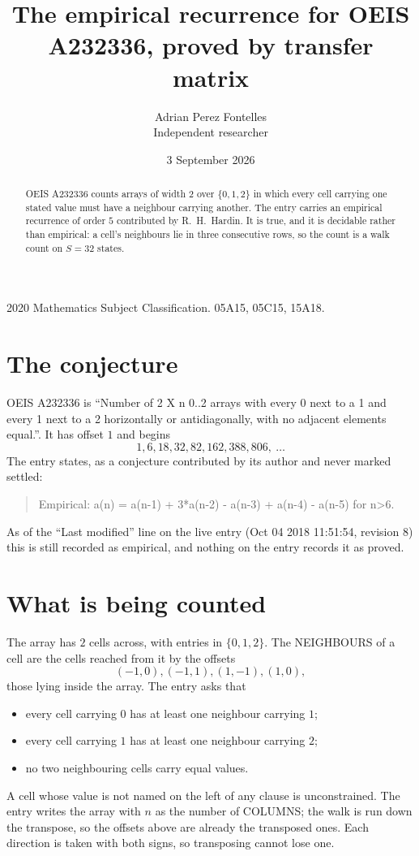 \documentclass[11pt,a4paper]{article}
\title{The empirical recurrence for OEIS A232336, proved by transfer matrix}
\author{Adrian Perez Fontelles\\ \small Independent researcher}
\date{3 September 2026}
\theoremstyle{plain}
\theoremstyle{definition}
\begin{document}
\maketitle

\begin{abstract}
OEIS A232336 counts arrays of width $2$ over $\{0,1,2\}$ in which every cell carrying one stated
value must have a neighbour carrying another. The entry carries an empirical recurrence of
order $5$ contributed by R.~H.~Hardin. It is true, and it is decidable rather than
empirical: a cell's neighbours lie in three consecutive rows, so the count is a walk count on
$S=32$ states.
\end{abstract}

\noindent\small 2020 Mathematics Subject Classification. 05A15, 05C15, 15A18.\normalsize

\section{The conjecture}

OEIS A232336 is ``Number of 2 X n 0..2 arrays with every 0 next to a 1 and every 1 next to a 2 horizontally or antidiagonally, with no adjacent elements equal.''. It has offset $1$ and begins
\[
1, 6, 18, 32, 82, 162, 388, 806,\ \dots
\]
The entry states, as a conjecture contributed by its author and never marked settled:
\begin{quote}
Empirical: a(n) = a(n-1) + 3*a(n-2) - a(n-3) + a(n-4) - a(n-5) for n>6.
\end{quote}
As of the ``Last modified'' line on the live entry (Oct 04 2018 11:51:54, revision 8) this is still
recorded as empirical, and nothing on the entry records it as proved.

\section{What is being counted}

The array has $2$ cells across, with entries in $\{0,1,2\}$. The NEIGHBOURS of a cell are the
cells reached from it by the offsets
\[
(-1,0), (-1,1), (1,-1), (1,0),
\]
those lying inside the array. The entry asks that
\begin{itemize}
\item every cell carrying $0$ has at least one neighbour carrying $1$;
\item every cell carrying $1$ has at least one neighbour carrying $2$;
\item no two neighbouring cells carry equal values.
\end{itemize}
A cell whose value is not named on the left of any clause is unconstrained. The entry writes the array with $n$ as the number of COLUMNS; the walk is run down the transpose, so the offsets above are already the transposed ones. Each direction is taken with both signs, so transposing cannot lose one.
\end{document}
